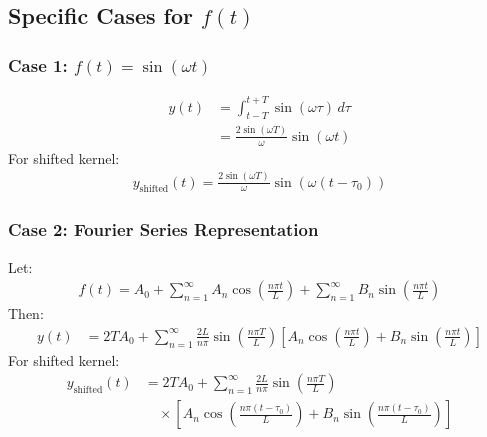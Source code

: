 \subsection*{Specific Cases for $f(t)$}
\subsubsection*{Case 1: $f(t) = \sin(\omega t)$}
\begin{align*}
y(t) &= \int_{t - T}^{t + T} \sin(\omega \tau) \,d\tau \\
     &= \frac{2 \sin(\omega T)}{\omega} \sin(\omega t)
\end{align*}
For shifted kernel:
\begin{align*}
y_{\text{shifted}}(t) = \frac{2 \sin(\omega T)}{\omega} \sin(\omega (t - \tau_0))
\end{align*}

\subsubsection*{Case 2: Fourier Series Representation}
Let:
\begin{align*}
f(t) = A_0 + \sum_{n=1}^\infty A_n \cos\left(\frac{n\pi t}{L}\right) + \sum_{n=1}^\infty B_n \sin\left(\frac{n\pi t}{L}\right)
\end{align*}
Then:
\begin{align*}
y(t) &= 2 T A_0 + \sum_{n=1}^\infty \frac{2 L}{n \pi} \sin\left(\frac{n \pi T}{L}\right) \left[ A_n \cos\left(\frac{n \pi t}{L}\right) + B_n \sin\left(\frac{n \pi t}{L}\right) \right]
\end{align*}
For shifted kernel:
\begin{align*}
y_{\text{shifted}}(t) &= 2 T A_0 + \sum_{n=1}^\infty \frac{2 L}{n \pi} \sin\left(\frac{n \pi T}{L}\right) \\
&\quad \times \left[ A_n \cos\left(\frac{n \pi (t - \tau_0)}{L}\right) + B_n \sin\left(\frac{n \pi (t - \tau_0)}{L}\right) \right]
\end{align*}

